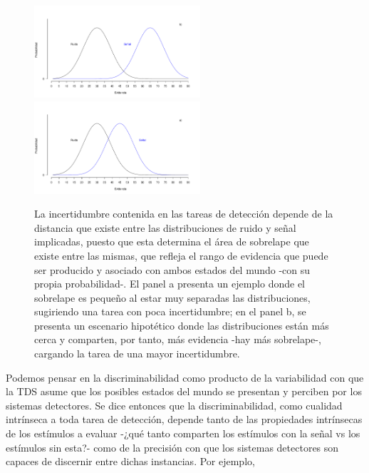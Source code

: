 \begin{itemize}
\begin{figure}[th]
\centering
\includegraphics[width=0.55\textwidth]{Figures/Overlap_Small}\\ 
\includegraphics[width=0.55\textwidth]{Figures/Overlap_Big} 
\caption[El sobrelape Ruido-señal como reflejo de la incertidumbre contenida en las tareas de detección]{La incertidumbre contenida en las tareas de detección depende de la distancia que existe entre las distribuciones de ruido y señal implicadas, puesto que esta determina el área de sobrelape que existe entre las mismas, que refleja el rango de evidencia que puede ser producido y asociado con ambos estados del mundo -con su propia probabilidad-. El panel a presenta un ejemplo donde el sobrelape es pequeño al estar muy separadas las distribuciones, sugiriendo una tarea con poca incertidumbre; en el panel b, se presenta un escenario hipotético donde las distribuciones están más cerca y comparten, por tanto, más evidencia -hay más sobrelape-, cargando la tarea de una mayor incertidumbre.}
\label{fig:Overlap}
\end{figure}

Podemos pensar en la discriminabilidad como producto de la variabilidad con que la TDS asume que los posibles estados del mundo se presentan y perciben por los sistemas detectores. Se dice entonces que la discriminabilidad, como cualidad intrínseca a toda tarea de detección, depende tanto de las propiedades intrínsecas de los estímulos a evaluar -¿qué tanto comparten los estímulos con la señal vs los estímulos sin esta?- como de la precisión con que los sistemas detectores son capaces de discernir entre dichas instancias. Por ejemplo, \\


\end{itemize}
